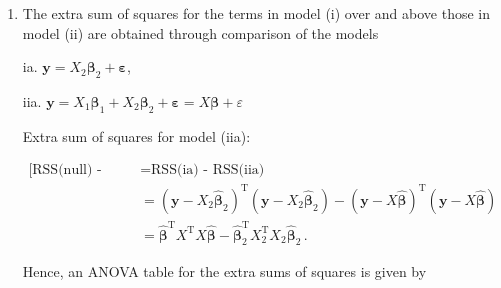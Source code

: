 \documentclass[
]{book}
\theoremstyle{definition}
\theoremstyle{definition}
\theoremstyle{definition}
\theoremstyle{definition}
\theoremstyle{remark}
\begin{document}
\begin{enumerate}
\def\labelenumi{\alph{enumi}.}
\item
  The extra sum of squares for the terms in model (i) over and above those in model (ii) are obtained through comparison of the models

  ia. \(\boldsymbol{y}= X_2\boldsymbol{\beta}_2 + \boldsymbol{\varepsilon}\),

  iia. \(\boldsymbol{y}= X_1\boldsymbol{\beta}_1 + X_2\boldsymbol{\beta}_2+ \boldsymbol{\varepsilon}= X\boldsymbol{\beta}+ \varepsilon\)

  Extra sum of squares for model (iia):

  \begin{align*}
  \mbox{[RSS(null) - RSS(iia)] - [RSS(null) - RSS(ia)]} & = \mbox{RSS(ia) - RSS(iia)}\\
  & = (\boldsymbol{y}- X_2\hat{\boldsymbol{\beta}}_2)^{\mathrm{T}}(\boldsymbol{y}- X_2\hat{\boldsymbol{\beta}}_2) - (\boldsymbol{y}- X\hat{\boldsymbol{\beta}})^{\mathrm{T}}(\boldsymbol{y}- X\hat{\boldsymbol{\beta}})\\
  & = \hat{\boldsymbol{\beta}}^{\mathrm{T}}X^{\mathrm{T}}X\hat{\boldsymbol{\beta}} - \hat{\boldsymbol{\beta}}_2^{\mathrm{T}}X_2^{\mathrm{T}}X_2\hat{\boldsymbol{\beta}}_2\,.
   \end{align*}

  Hence, an ANOVA table for the extra sums of squares is given by


\end{enumerate}
\end{document}
